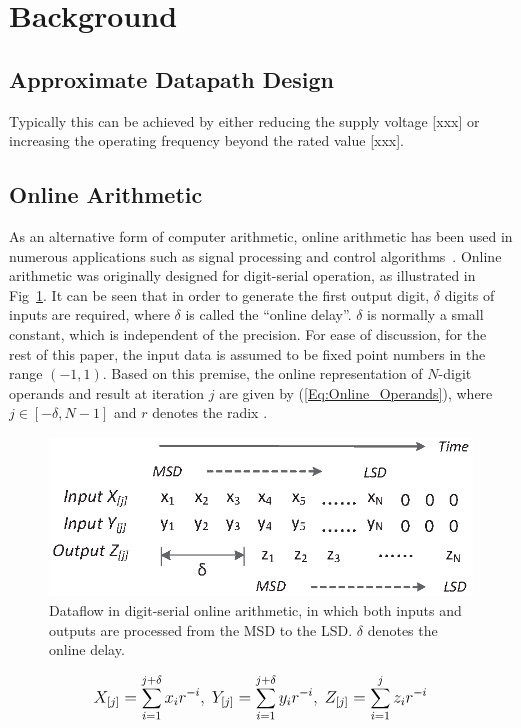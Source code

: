 \documentclass[10pt, conference, compsocconf]{IEEEtran}
\begin{document}
\section{Background}\label{sec:Background}
\subsection{Approximate Datapath Design}
Typically this can be achieved by either reducing the supply voltage [xxx] or increasing the operating frequency beyond the rated value [xxx].

\subsection{Online Arithmetic}

As an alternative form of computer arithmetic, online arithmetic has been used in numerous applications such as signal processing and control algorithms~\cite{Online_FPGADSP,Online_Control}. Online arithmetic was originally designed for digit-serial operation, as illustrated in Fig~\ref{Fig:OnlineDataFlow}. It can be seen that in order to generate the first output digit, $\delta$ digits of inputs are required, where $\delta$ is called the ``online delay''. $\delta$ is normally a small constant, which is independent of the precision. For ease of discussion, for the rest of this paper, the input data is assumed to be fixed point numbers in the range $(-1,1)$. Based on this premise, the online representation of $N$-digit operands and result at iteration $j$ are given by (\ref{Eq:Online_Operands}), where $j\in[-\delta,N-1]$ and $r$ denotes the radix \cite{Ercegovac_Book}.
%
\begin{figure}[htbp]
  \centering
  \includegraphics[width=.42\textwidth]{./figures/OnlineArithmetic_DataFlow.eps}
  \caption{Dataflow in digit-serial online arithmetic, in which both inputs and outputs are processed from the MSD to the LSD. $\delta$ denotes the online delay.}
  \vspace{-2ex}
  \label{Fig:OnlineDataFlow}
\end{figure}
%
\begin{eqnarray}\label{Eq:Online_Operands}
\footnotesize
  X_{[j]}=\sum_{i=1}^{j+\delta}x_ir^{-i},~Y_{[j]}=\sum_{i=1}^{j+\delta}y_ir^{-i},~Z_{[j]}=\sum_{i=1}^{j}z_ir^{-i}
\normalsize
\end{eqnarray}
\end{document}
